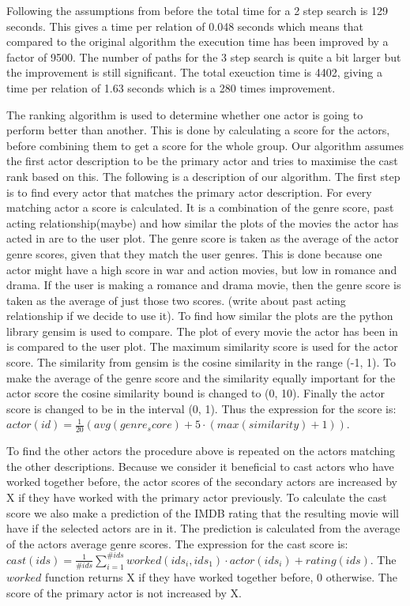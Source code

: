 Following the assumptions from before the total time for a 2 step search is 129 seconds. This gives a time per relation of 0.048 seconds which means that compared to the original algorithm the execution time has been improved by a factor of 9500. The number of paths for the 3 step search is quite a bit larger but the improvement is still significant. The total exeuction time is 4402, giving a time per relation of 1.63 seconds which is a 280 times improvement.


The ranking algorithm is used to determine whether one actor is going to perform better than another. This is done by calculating a score for the actors, before combining them to get a score for the whole group. Our algorithm assumes the first actor description to be the primary actor and tries to maximise the cast rank based on this. The following is a description of our algorithm. The first step is to find every actor that matches the primary actor description. For every matching actor a score is calculated. It is a combination of the genre score, past acting relationship(maybe) and how similar the plots of the movies the actor has acted in are to the user plot. The genre score is taken as the average of the actor genre scores, given that they match the user genres. This is done because one actor might have a high score in war and action movies, but low in romance and drama. If the user is making a romance and drama movie, then the genre score is taken as the average of just those two scores. (write about past acting relationship if we decide to use it). To find how similar the plots are the python library gensim is used to compare. The plot of every movie the actor has been in is compared to the user plot. The maximum similarity score is used for the actor score. The similarity from gensim is the cosine similarity in the range (-1, 1). To make the average of the genre score and the similarity equally important for the actor score the cosine similarity bound is changed to (0, 10). Finally the actor score is changed to be in the interval (0, 1). Thus the expression for the score is: $actor(id)=\frac{1}{20}(avg(genre_score) + 5\cdot(max(similarity)+1))$.

To find the other actors the procedure above is repeated on the actors matching the other descriptions. Because we consider it beneficial to cast actors who have worked together before, the actor scores of the secondary actors are increased by X if they have worked with the primary actor previously. To calculate the cast score we also make a prediction of the IMDB rating that the resulting movie will have if the selected actors are in it. The prediction is calculated from the average of the actors average genre scores. The expression for the cast score is: $cast(ids)=\frac{1}{\#ids}\sum_{i=1}^{\#ids}worked(ids_i, ids_1)\cdot actor(ids_i) + rating(ids)$. The $worked$ function returns X if they have worked together before, 0 otherwise. The score of the primary actor is not increased by X.

